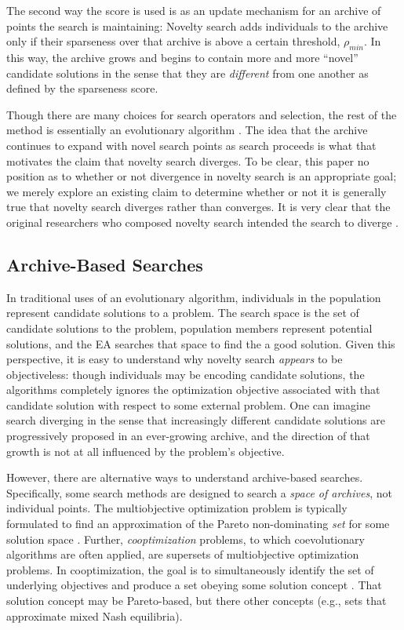 \documentclass[twoside]{article}
\begin{document}
The second way the score is used is as an update mechanism for an archive of points the search is maintaining:  Novelty search adds individuals to the archive only if their sparseness over that archive is above a certain threshold, $\rho_{min}$.  In this way, the archive grows and begins to contain more and more ``novel'' candidate solutions in the sense that they are \emph{different} from one another as defined by the sparseness score.

Though there are many choices for search operators and selection, the rest of the method is essentially an evolutionary algorithm \citep{ec:DeJong2006}.  The idea that the archive continues to expand with novel search points as search proceeds is what that motivates the claim that novelty search diverges.  To be clear, this paper no position as to whether or not divergence in novelty search is an appropriate goal; we merely explore an existing claim to determine whether or not it is generally true that novelty search diverges rather than converges.  It is very clear that the original researchers who composed novelty search intended the search to diverge \citep{Lehman2016frai,Lehman2015gecco,StanleyLehman2015}.


\subsection{Archive-Based Searches}
\label{subsec:archive}

In traditional uses of an evolutionary algorithm, individuals in the population represent candidate solutions to a problem.  The search space is the set of candidate solutions to the problem, population members represent potential solutions, and the EA searches that space to find the a good solution.  Given this perspective, it is easy to understand why novelty search \emph{appears} to be objectiveless:  though individuals may be encoding candidate solutions, the algorithms completely ignores the optimization objective associated with that candidate solution with respect to some external problem.  One can imagine search diverging in the sense that increasingly different candidate solutions are progressively proposed in an ever-growing archive, and the direction of that growth is not at all influenced by the problem's objective.  

However, there are alternative ways to understand archive-based searches.  Specifically, some search methods are designed to search a \emph{space of archives}, not individual points.  The multiobjective optimization problem is typically formulated to find an approximation of the Pareto non-dominating \emph{set} for some solution space \citep{SeadaDeb2018moo,Zitzler2012,Zitzler2000ecj}.  Further, \emph{cooptimization} problems, to which coevolutionary algorithms are often applied, are supersets of multiobjective optimization problems.  In cooptimization, the goal is to simultaneously identify the set of underlying objectives and produce a set obeying some solution concept \citep{FiciciPollack2001ecal,BucciPollack2002foga,Popovici2012,Ficici2008mpsn}.  That solution concept may be Pareto-based, but there other concepts (e.g., sets that approximate mixed Nash equilibria).
\end{document}
